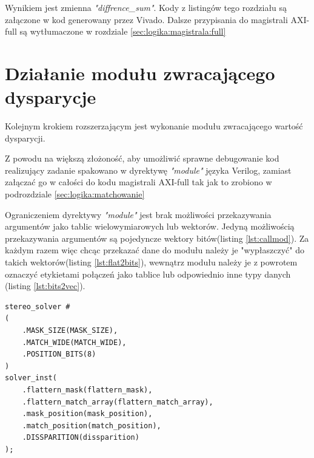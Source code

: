 Wynikiem jest zmienna \textit{"diffrence\_sum"}.
Kody z listingów tego rozdziału są załączone w kod generowany przez Vivado.
Dalsze przypisania do magistrali
AXI-full są wytłumaczone w rozdziale \ref{sec:logika:magistrala:full}




\section{Działanie modułu zwracającego dysparycje}
\label{sec:logika:dysparycja}

Kolejnym krokiem rozszerzającym jest wykonanie modułu zwracającego wartość dysparycji.

Z powodu na większą złożoność, aby umożliwić sprawne debugowanie kod realizujący
zadanie spakowano w dyrektywę \textit{"module"} języka Verilog, zamiast załączać 
go w całości do kodu magistrali AXI-full tak jak to zrobiono w podrozdziale \ref{sec:logika:matchowanie}

Ograniczeniem dyrektywy \textit{"module"} jest brak możliwości przekazywania
argumentów jako tablic wielowymiarowych lub wektorów. Jedyną możliwością przekazywania
argumentów są pojedyncze wektory bitów(listing \ref{lst:callmod}). Za każdym razem więc chcąc przekazać
dane do modułu należy je "wypłaszczyć" do takich wektorów(listing \ref{lst:flat2bits}),
wewnątrz modułu należy je z powrotem oznaczyć etykietami połączeń jako tablice
lub odpowiednio inne typy danych (listing \ref{lst:bits2vec}).

\begin{lstlisting}[label={lst:callmod},
caption={wywoływanie kodu modułu "stereo\_solver" urządzenia w języku Verilog}]
stereo_solver #
(
	.MASK_SIZE(MASK_SIZE),
	.MATCH_WIDE(MATCH_WIDE),
	.POSITION_BITS(8)
)
solver_inst(
	.flattern_mask(flattern_mask),
	.flattern_match_array(flattern_match_array),
	.mask_position(mask_position),
	.match_position(match_position),
	.DISSPARITION(dissparition)
);

\end{lstlisting}


